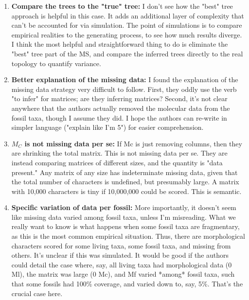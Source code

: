 \documentclass[12pt,letterpaper]{article}
\begin{document}
\begin{enumerate}
\item{\textbf{Compare the trees to the "true" tree:}} I don't see how the "best" tree approach is helpful in this case. It adds an additional layer of complexity that can't be accounted for via simulation. The point of simulations is to compare empirical realities to the generating process, to see how much results diverge. I think the most helpful and straightforward thing to do is eliminate the "best" tree part of the MS, and compare the inferred trees directly to the real topology to quantify variance.
\item{\textbf{Better explanation of the missing data:}} I found the explanation of the missing data strategy very difficult to follow. First, they oddly use the verb "to infer" for matrices; are they inferring matrices? Second, it's not clear anywhere that the authors actually removed the molecular data from the fossil taxa, though I assume they did. I hope the authors can re-write in simpler language ("explain like I'm 5") for easier comprehension.
\item{\textbf{$M_C$ is not missing data per se:}} If Mc is just removing columns, then they are shrinking the total matrix. This is not missing data per se. They are instead comparing matrices of different sizes, and the quantity is "data present." Any matrix of any size has indeterminate missing data, given that the total number of characters is undefined, but presumably large. A matrix with 10,000 characters is tiny if 10,000,000 could be scored. This is semantic.
\item{\textbf{Specific variation of data per fossil:}} More importantly, it doesn't seem like missing data varied among fossil taxa, unless I'm misreading. What we really want to know is what happens when some fossil taxa are fragmentary, as this is the most common empirical situation. Thus, there are morphological characters scored for some living taxa, some fossil taxa, and missing from others. It's unclear if this was simulated. It would be good if the authors could detail the case where, say, all living taxa had morphological data (0 Ml), the matrix was large (0 Mc), and Mf varied *among* fossil taxa, such that some fossils had 100\% coverage, and varied down to, say, 5\%. That's the crucial case here.
\end{enumerate}
\end{document}
